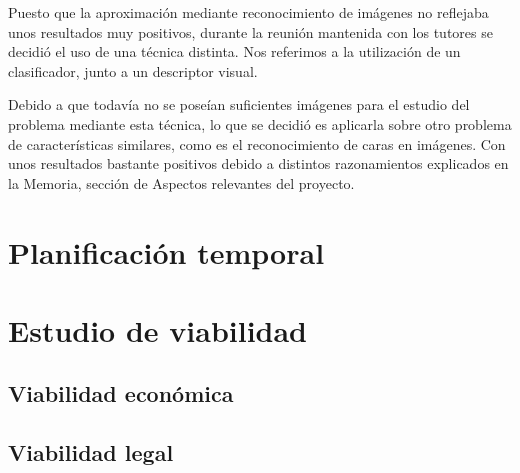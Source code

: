 Puesto que la aproximación mediante reconocimiento de imágenes no reflejaba unos resultados muy positivos, durante la reunión mantenida con los tutores se decidió el uso de una técnica distinta. Nos referimos a la utilización  de un clasificador, junto a un descriptor visual.

Debido a que todavía no se poseían suficientes imágenes para el estudio del problema mediante esta técnica, lo que se decidió es aplicarla sobre otro problema de características similares, como es el reconocimiento de caras en imágenes. Con unos resultados bastante positivos debido a distintos razonamientos explicados en la Memoria, sección de Aspectos relevantes del proyecto.

\begin{comment}
\begin{figure}[h]
\centering
\texttt{[image: semana\_1]}
\caption{Burndown de la \textit{sprint} 1}
\label{fig:A.1.1}
\end{figure}
\end{comment}

\section{Planificación temporal}

\section{Estudio de viabilidad}

\subsection{Viabilidad económica}

\subsection{Viabilidad legal}


